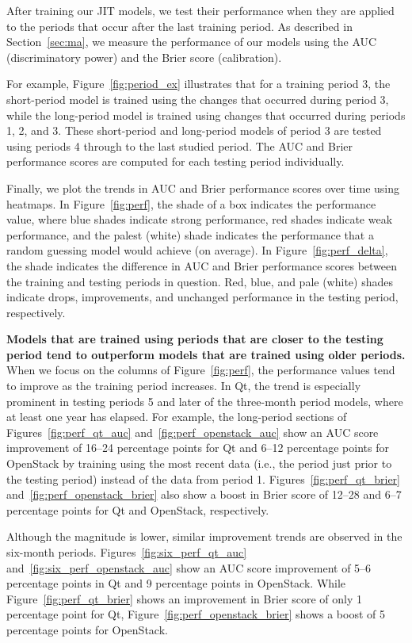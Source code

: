 After training our JIT models, we test their performance when they are applied to the periods that occur after the last training period.
As described in Section~\ref{sec:ma}, we measure the performance of our models using the AUC (discriminatory power) and the Brier score (calibration).

For example, Figure~\ref{fig:period_ex} illustrates that for a training period 3, the short-period model is trained using the changes that occurred during period 3, while the long-period model is trained using changes that occurred during periods 1, 2, and 3.
These short-period and long-period models of period 3 are tested using periods 4 through to the last studied period.
The AUC and Brier performance scores are computed for each testing period individually.

Finally, we plot the trends in AUC and Brier performance scores over time using heatmaps.
In Figure~\ref{fig:perf}, the shade of a box indicates the performance value, where blue shades indicate strong performance, red shades indicate weak performance, and the palest (white) shade indicates the performance that a random guessing model would achieve (on average).
In Figure~\ref{fig:perf_delta}, the shade indicates the difference in AUC and Brier performance scores between the training and testing periods in question.
Red, blue, and pale (white) shades indicate drops, improvements, and unchanged performance in the testing period, respectively.

\textbf{Models that are trained using periods that are closer to the testing period tend to outperform models that are trained using older periods.}
When we focus on the columns of Figure~\ref{fig:perf}, the performance values tend to improve as the training period increases.
In {\sc Qt}, the trend is especially prominent in testing periods 5 and later of the three-month period models, where at least one year has elapsed.
For example, the long-period sections of Figures~\ref{fig:perf_qt_auc} and~\ref{fig:perf_openstack_auc} show an AUC score improvement of 16--24 percentage points for {\sc Qt} and 6--12 percentage points for {\sc OpenStack} by training using the most recent data (i.e., the period just prior to the testing period) instead of the data from period 1.
Figures~\ref{fig:perf_qt_brier} and~\ref{fig:perf_openstack_brier} also show a boost in Brier score of 12--28 and 6--7 percentage points for {\sc Qt} and {\sc OpenStack}, respectively.

Although the magnitude is lower, similar improvement trends are observed in the six-month periods.
Figures~\ref{fig:six_perf_qt_auc} and~\ref{fig:six_perf_openstack_auc} show an AUC score improvement of 5--6 percentage points in {\sc Qt} and 9 percentage points in {\sc OpenStack}.
While Figure~\ref{fig:perf_qt_brier} shows an improvement in Brier score of only 1 percentage point for {\sc Qt}, Figure~\ref{fig:perf_openstack_brier} shows a boost of 5 percentage points for {\sc OpenStack}.

